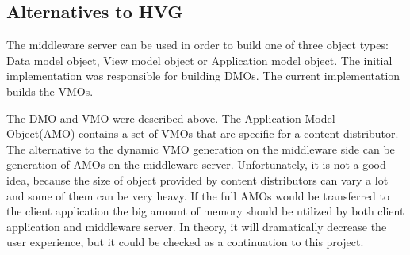 \subsection{Alternatives to HVG}

The middleware server can be used in order to build one of three object types: Data model object, View model object or Application model object. The initial implementation was responsible for building DMOs. The current implementation builds the VMOs.

The DMO and VMO were described above. The Application Model Object(AMO) contains a set of VMOs that are specific for a content distributor. The alternative to the dynamic VMO generation on the middleware side can be generation of AMOs on the middleware server. Unfortunately, it is not a good idea, because the size of object provided by content distributors can
vary a lot and some of them can be very heavy. If the full AMOs would be transferred to the client application the big amount of memory should be utilized by both client application and middleware server. In theory, it will dramatically decrease the user experience, but it could be checked as a continuation to this project.


\newpage